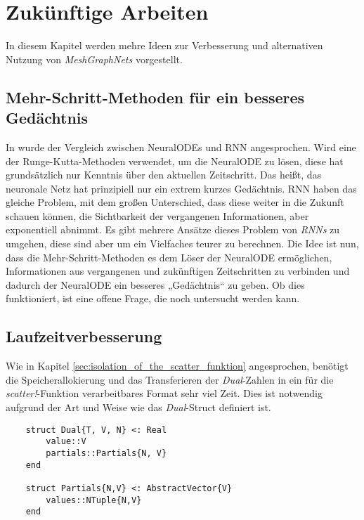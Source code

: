 
\section{Zukünftige Arbeiten} \label{sec:future_work}

In diesem Kapitel werden mehre Ideen zur Verbesserung und alternativen Nutzung von \textit{MeshGraphNets} vorgestellt.

\subsection{Mehr-Schritt-Methoden für ein besseres Gedächtnis} \label{sec:better_memory}

In \cite{neuralode} wurde der Vergleich zwischen NeuralODEs und RNN angesprochen.
Wird eine der Runge-Kutta-Methoden verwendet, um die NeuralODE zu lösen, diese hat grundsätzlich nur Kenntnis
über den aktuellen Zeitschritt.
Das heißt, das neuronale Netz hat prinzipiell nur ein extrem kurzes Gedächtnis.
RNN haben das gleiche Problem, mit dem großen Unterschied, dass diese weiter in die Zukunft schauen können, 
die Sichtbarkeit der vergangenen Informationen, aber exponentiell abnimmt.
Es gibt mehrere Ansätze dieses Problem von \textit{RNNs} zu umgehen, 
diese sind aber um ein Vielfaches teurer zu berechnen.
Die Idee ist nun, dass die Mehr-Schritt-Methoden es dem Löser der NeuralODE ermöglichen, Informationen 
aus vergangenen und zukünftigen Zeitschritten zu verbinden und dadurch der NeuralODE ein besseres 
„Gedächtnis“ zu geben.
Ob dies funktioniert, ist eine offene Frage, die noch untersucht werden kann.

\subsection{Laufzeitverbesserung}

Wie in Kapitel \ref{sec:isolation_of_the_scatter_funktion}
angesprochen, benötigt die Speicherallokierung und 
das Transferieren der \textit{Dual}-Zahlen in ein für die \textit{scatter!}-Funktion verarbeitbares Format sehr viel Zeit.
Dies ist notwendig aufgrund der Art und Weise wie das \textit{Dual}-Struct definiert ist.

\begin{lstlisting}
    struct Dual{T, V, N} <: Real
        value::V
        partials::Partials{N, V}
    end

    struct Partials{N,V} <: AbstractVector{V}
        values::NTuple{N,V}
    end
\end{lstlisting}

